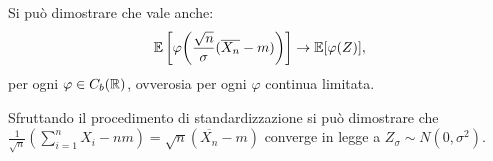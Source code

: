 \begin{multicols*}{2}
\begin{remark}
    Si può dimostrare che vale anche:
    \[
        \mathbb{E}\left[\varphi\!\left(\frac{\sqrt{n}}{\sigma} (\overline{X_n} - m)\right)\right] \to \mathbb{E}[\varphi(Z)],
    \]
    per ogni $\varphi \in C_b(\mathbb{R})$, ovverosia per ogni $\varphi$ continua limitata.
\end{remark}

\begin{remark}
    Sfruttando il procedimento di standardizzazione si può dimostrare che
    $\frac{1}{\sqrt{n}} \left(\sum_{i=1}^n X_i - nm\right) = \sqrt{n}(\overline{X_n} - m)$ converge
    in legge a $Z_\sigma \sim N(0, \sigma^2)$.
\end{remark}

\end{multicols*}